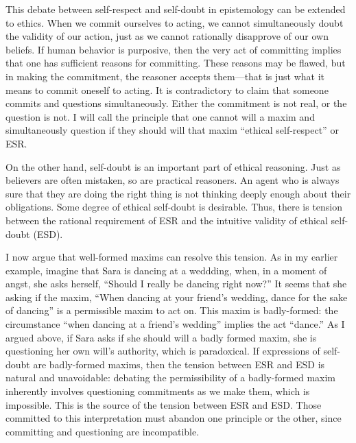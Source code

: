 \begin{isabellebody}
\begin{isamarkuptext}
This debate between self-respect and self-doubt in epistemology can be extended to ethics. When we 
commit ourselves to acting, we cannot simultaneously doubt the validity of our action, just as we cannot
rationally disapprove of our own beliefs. If human 
behavior is purposive, then the very act of committing implies that one has sufficient reasons for 
committing. These reasons may be flawed, but in making the commitment, the reasoner accepts them—that is 
just what it means to commit oneself to acting. It 
is contradictory to claim that someone commits and questions simultaneously. Either the commitment 
is not real, or the question is not. I will call the principle that one cannot will a maxim and 
simultaneously question if they should will that maxim ``ethical self-respect'' or ESR.

On the other hand, self-doubt is an important part of ethical reasoning. Just as believers are often 
mistaken, so are practical reasoners. An agent who is always sure that they are doing the right thing 
is not thinking deeply enough about their obligations. Some degree of ethical self-doubt is desirable. 
Thus, there is tension between the rational requirement of ESR and the intuitive validity of ethical 
self-doubt (ESD).

I now argue that well-formed maxims can resolve this tension. As in my earlier example, imagine that Sara is dancing at a 
weddding, when, in a moment of angst, she asks herself, ``Should I really be dancing right now?'' 
It seems that she asking if the maxim, ``When dancing at your friend's wedding, dance for the sake 
of dancing'' is a permissible maxim to act on. This maxim is badly-formed: the 
circumstance ``when dancing at a friend's wedding'' implies the act ``dance.'' As I argued above, if 
Sara asks if she should will a badly formed maxim, she is questioning her own will's authority, which
is paradoxical. If expressions of self-doubt are badly-formed maxims, then the tension between ESR
and ESD is natural and unavoidable: debating the permissibility of a badly-formed maxim inherently
involves questioning commitments as we make them, which is impossible. This is the source of the 
tension between ESR and ESD. Those committed to this 
interpretation must abandon one principle or the other, since committing and questioning are incompatible.


\end{isamarkuptext}
\end{isabellebody}
